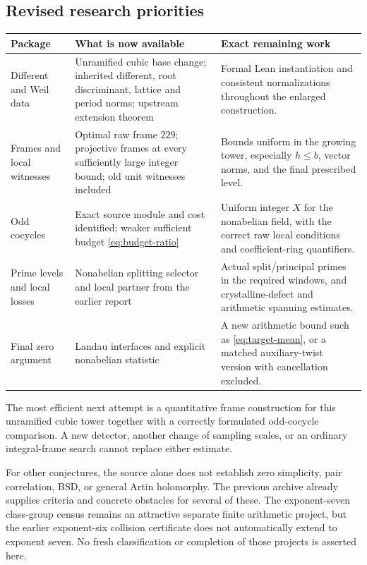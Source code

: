 \subsection{Revised research priorities}

\begin{longtable}{@{}L{.26\textwidth}L{.34\textwidth}L{.33\textwidth}@{}}
\toprule
Package & What is now available & Exact remaining work\\
\midrule\endhead
Different and Weil data & Unramified cubic base change; inherited different, root discriminant, lattice and period norms; upstream extension theorem & Formal Lean instantiation and consistent normalizations throughout the enlarged construction.\\[5pt]
Frames and local witnesses & Optimal raw frame $229$; projective frames at every sufficiently large integer bound; old unit witnesses included & Bounds uniform in the growing tower, especially $h\le b$, vector norms, and the final prescribed level.\\[5pt]
Odd cocycles & Exact source module and cost identified; weaker sufficient budget \eqref{eq:budget-ratio} & Uniform integer $X$ for the nonabelian field, with the correct raw local conditions and coefficient-ring quantifiers.\\[5pt]
Prime levels and local losses & Nonabelian splitting selector and local partner from the earlier report & Actual split/principal primes in the required windows, and crystalline-defect and arithmetic spanning estimates.\\[5pt]
Final zero argument & Landau interfaces and explicit nonabelian statistic & A new arithmetic bound such as \eqref{eq:target-mean}, or a matched auxiliary-twist version with cancellation excluded.\\
\bottomrule
\end{longtable}

The most efficient next attempt is a quantitative frame construction for this unramified cubic tower together with a correctly formulated odd-cocycle comparison. A new detector, another change of sampling scales, or an ordinary integral-frame search cannot replace either estimate.

For other conjectures, the source alone does not establish zero simplicity, pair correlation, BSD, or general Artin holomorphy. The previous archive already supplies criteria and concrete obstacles for several of these. The exponent-seven class-group census remains an attractive separate finite arithmetic project, but the earlier exponent-six collision certificate does not automatically extend to exponent seven. No fresh classification or completion of those projects is asserted here.
